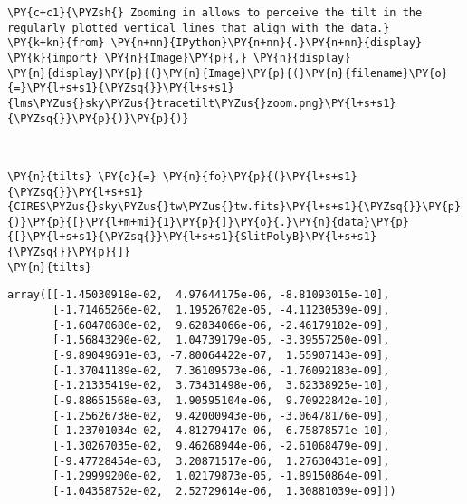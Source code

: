     \begin{tcolorbox}[breakable, size=fbox, boxrule=1pt, pad at break*=1mm,colback=cellbackground, colframe=cellborder]
\begin{Verbatim}[commandchars=\\\{\}]
\PY{c+c1}{\PYZsh{} Zooming in allows to perceive the tilt in the regularly plotted vertical lines that align with the data.}
\PY{k+kn}{from} \PY{n+nn}{IPython}\PY{n+nn}{.}\PY{n+nn}{display} \PY{k}{import} \PY{n}{Image}\PY{p}{,} \PY{n}{display}
\PY{n}{display}\PY{p}{(}\PY{n}{Image}\PY{p}{(}\PY{n}{filename}\PY{o}{=}\PY{l+s+s1}{\PYZsq{}}\PY{l+s+s1}{lms\PYZus{}sky\PYZus{}tracetilt\PYZus{}zoom.png}\PY{l+s+s1}{\PYZsq{}}\PY{p}{)}\PY{p}{)}
\end{Verbatim}
\end{tcolorbox}

    \begin{center}
    \end{center}
    { \hspace*{\fill} \\}
    
    \begin{tcolorbox}[breakable, size=fbox, boxrule=1pt, pad at break*=1mm,colback=cellbackground, colframe=cellborder]
\begin{Verbatim}[commandchars=\\\{\}]
\PY{n}{tilts} \PY{o}{=} \PY{n}{fo}\PY{p}{(}\PY{l+s+s1}{\PYZsq{}}\PY{l+s+s1}{CIRES\PYZus{}sky\PYZus{}tw\PYZus{}tw.fits}\PY{l+s+s1}{\PYZsq{}}\PY{p}{)}\PY{p}{[}\PY{l+m+mi}{1}\PY{p}{]}\PY{o}{.}\PY{n}{data}\PY{p}{[}\PY{l+s+s1}{\PYZsq{}}\PY{l+s+s1}{SlitPolyB}\PY{l+s+s1}{\PYZsq{}}\PY{p}{]}
\PY{n}{tilts}
\end{Verbatim}
\end{tcolorbox}

            \begin{tcolorbox}[breakable, size=fbox, boxrule=.5pt, pad at break*=1mm, opacityfill=0]
\begin{Verbatim}[commandchars=\\\{\}]
array([[-1.45030918e-02,  4.97644175e-06, -8.81093015e-10],
       [-1.71465266e-02,  1.19526702e-05, -4.11230539e-09],
       [-1.60470680e-02,  9.62834066e-06, -2.46179182e-09],
       [-1.56843290e-02,  1.04739179e-05, -3.39557250e-09],
       [-9.89049691e-03, -7.80064422e-07,  1.55907143e-09],
       [-1.37041189e-02,  7.36109573e-06, -1.76092183e-09],
       [-1.21335419e-02,  3.73431498e-06,  3.62338925e-10],
       [-9.88651568e-03,  1.90595104e-06,  9.70922842e-10],
       [-1.25626738e-02,  9.42000943e-06, -3.06478176e-09],
       [-1.23701034e-02,  4.81279417e-06,  6.75878571e-10],
       [-1.30267035e-02,  9.46268944e-06, -2.61068479e-09],
       [-9.47728454e-03,  3.20871517e-06,  1.27630431e-09],
       [-1.29999200e-02,  1.02179873e-05, -1.89150864e-09],
       [-1.04358752e-02,  2.52729614e-06,  1.30881039e-09]])
\end{Verbatim}
\end{tcolorbox}
        
